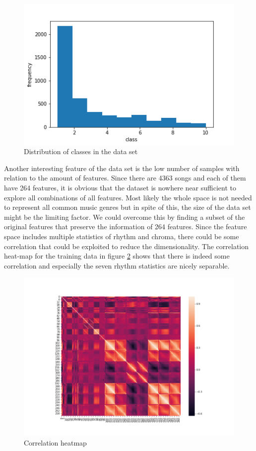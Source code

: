 \documentclass[fleqn,10pt]{SelfArx} %
\begin{document}
\begin{figure}[H]
  \includegraphics[width=\linewidth]{class-dist-hist.png}
  \caption{Distribution of classes in the data set}
  \label{fig:dist-hist}
\end{figure}

Another interesting feature of the data set is the low number of samples with
relation to the amount of features. Since there are 4363 songs and each of them
have 264 features, it is obvious that the dataset is nowhere near sufficient to
explore all combinations of all features. Most likely the whole space is not
needed to represent all common music genres but in spite of this, the size of
the data set might be the limiting factor. We could overcome this by finding a
subset of the original features that preserve the information of 264 features.
Since the feature space includes multiple statistics of rhythm and chroma, there
could be some correlation that could be exploited to reduce the dimensionality.
The correlation heat-map for the training data in figure \ref{fig:heatmap} shows
that there is indeed some correlation and especially the seven rhythm statistics
are nicely separable.

\begin{figure}[H]
  \centering
  \includegraphics[width=\linewidth]{heatmap.png}
  \caption{Correlation heatmap}
  \label{fig:heatmap}
\end{figure}
\end{document}
